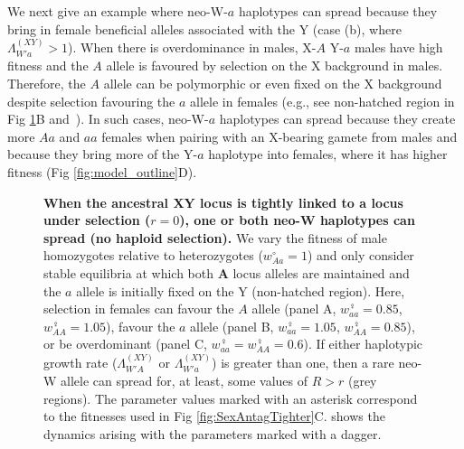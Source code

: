 \documentclass[10pt,letterpaper]{article}
\providecommand{\DIFdelbeginFL}{} %
\providecommand{\DIFdelendFL}{} %
\begin{document}
We next give an example where neo-W-$a$ haplotypes can spread because they bring in female beneficial alleles associated with the Y (case (b), where $\Lambda_{W'a}^{(XY)}>1$). 
When there is overdominance in males, X-$A$ Y-$a$ males have high fitness and the $A$ allele is favoured by selection on the X background in males.
Therefore, the $A$ allele can be polymorphic or even fixed on the X background despite selection favouring the $a$ allele in females (e.g., see non-hatched region in Fig \ref{fig:regionplots}B and~\cite{Lloyd1977,Otto2014}). 
In such cases, neo-W-$a$ haplotypes can spread because they create more $Aa$ and $aa$ females when pairing with an X-bearing gamete from males and because they bring more of the Y-$a$ haplotype into females, where it has higher fitness (Fig \ref{fig:model_outline}D). 

\begin{figure}[!h]
\centering
\DIFdelbeginFL %
\DIFdelendFL %
\caption{
{\bf When the ancestral XY locus is tightly linked to a locus under selection ($r=0$), one or both neo-W haplotypes can spread (no haploid selection).}
We vary the fitness of male homozygotes relative to heterozygotes ($w_{Aa}^\circ=1$) and only consider stable equilibria at which both $\mathbf{A}$ locus alleles are maintained and the $a$ allele is initially fixed on the Y (non-hatched region). 
Here, selection in females can favour the $A$ allele (panel A, $w_{aa}^\female=0.85$, $w_{AA}^\female=1.05$), favour the $a$ allele (panel B, $w_{aa}^\female=1.05$, $w_{AA}^\female=0.85$), or be overdominant (panel C, $w_{aa}^\female=w_{AA}^\female=0.6$). 
If either haplotypic growth rate ($\Lambda_{W'A}^{(XY)}$ or $\Lambda_{W'a}^{(XY)}$) is greater than one, then a rare neo-W allele can spread for, at least, some values of $R>r$ (grey regions). 
The parameter values marked with an asterisk correspond to the fitnesses used in Fig \ref{fig:SexAntagTighter}C. 
 shows the dynamics arising with the parameters marked with a dagger. 
}
\label{fig:regionplots}
\end{figure}
\end{document}
